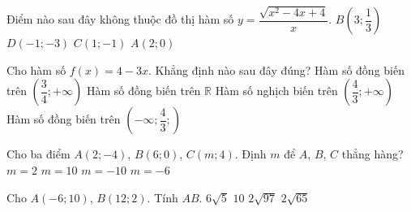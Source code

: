 \begin{ex}%
	Điểm nào sau đây không thuộc đồ thị hàm số $ y = \dfrac{\sqrt{x^2 - 4x + 4}}{x} $.
	\choice
	{$ B\left(3;\dfrac{1}{3}\right) $}
	{$ D\left(-1;-3\right) $}
	{\True $ C\left(1;-1\right) $}
	{$ A\left(2;0\right) $}
\end{ex}

\begin{ex}%
	Cho hàm số $ f(x) = 4 - 3x $. Khẳng định nào sau đây đúng?
	\choice
	{Hàm số đồng biến trên $ \left(\dfrac{3}{4};+\infty\right) $}
	{Hàm số đồng biến trên $ \mathbb{R} $}
	{\True Hàm số nghịch biến trên $ \left(\dfrac{4}{3};+\infty\right) $}
	{Hàm số đồng biến trên $ \left(-\infty;\dfrac{4}{3};\right) $}
\end{ex}

\begin{ex}%
	Cho ba điểm $ A\left(2;-4\right) $, $ B\left(6;0\right) $, $ C\left(m;4\right) $. Định $ m $ để $ A $, $ B $, $ C $ thẳng hàng?
	\choice
	{$ m = 2 $}
	{\True $ m = 10 $}
	{$ m = -10 $}
	{$ m = -6 $}
\end{ex}

\begin{ex}%
	Cho $ A\left(-6;10\right) $, $ B\left(12;2\right) $. Tính $ AB $.
	\choice
	{$ 6\sqrt{5} $}
	{$ 10 $}
	{\True $ 2\sqrt{97} $}
	{$ 2\sqrt{65} $}
\end{ex}

